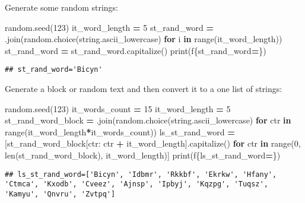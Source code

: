 \documentclass[
]{book}
\newenvironment{Shaded}{\begin{snugshade}}{\end{snugshade}}
\newcommand{\BuiltInTok}[1]{#1}
\newcommand{\ControlFlowTok}[1]{\textcolor[rgb]{0.13,0.29,0.53}{\textbf{#1}}}
\newcommand{\DecValTok}[1]{\textcolor[rgb]{0.00,0.00,0.81}{#1}}
\newcommand{\KeywordTok}[1]{\textcolor[rgb]{0.13,0.29,0.53}{\textbf{#1}}}
\newcommand{\NormalTok}[1]{#1}
\newcommand{\OperatorTok}[1]{\textcolor[rgb]{0.81,0.36,0.00}{\textbf{#1}}}
\newcommand{\SpecialCharTok}[1]{\textcolor[rgb]{0.00,0.00,0.00}{#1}}
\newcommand{\SpecialStringTok}[1]{\textcolor[rgb]{0.31,0.60,0.02}{#1}}
\newcommand{\StringTok}[1]{\textcolor[rgb]{0.31,0.60,0.02}{#1}}
\begin{document}
Generate some random strings:

\begin{Shaded}
\begin{Highlighting}[]
\NormalTok{random.seed(}\DecValTok{123}\NormalTok{)}
\NormalTok{it\_word\_length }\OperatorTok{=} \DecValTok{5}
\NormalTok{st\_rand\_word }\OperatorTok{=} \StringTok{\textquotesingle{}\textquotesingle{}}\NormalTok{.join(random.choice(string.ascii\_lowercase) }\ControlFlowTok{for}\NormalTok{ i }\KeywordTok{in} \BuiltInTok{range}\NormalTok{(it\_word\_length))}
\NormalTok{st\_rand\_word }\OperatorTok{=}\NormalTok{ st\_rand\_word.capitalize()}
\BuiltInTok{print}\NormalTok{(}\SpecialStringTok{f\textquotesingle{}}\SpecialCharTok{\{}\NormalTok{st\_rand\_word}\OperatorTok{=}\SpecialCharTok{\}}\SpecialStringTok{\textquotesingle{}}\NormalTok{)}
\end{Highlighting}
\end{Shaded}

\begin{verbatim}
## st_rand_word='Bicyn'
\end{verbatim}

Generate a block or random text and then convert it to a one list of strings:

\begin{Shaded}
\begin{Highlighting}[]
\NormalTok{random.seed(}\DecValTok{123}\NormalTok{)}
\NormalTok{it\_words\_count }\OperatorTok{=} \DecValTok{15}
\NormalTok{it\_word\_length }\OperatorTok{=} \DecValTok{5}
\NormalTok{st\_rand\_word\_block }\OperatorTok{=} \StringTok{\textquotesingle{}\textquotesingle{}}\NormalTok{.join(random.choice(string.ascii\_lowercase) }\ControlFlowTok{for}\NormalTok{ ctr }\KeywordTok{in} \BuiltInTok{range}\NormalTok{(it\_word\_length}\OperatorTok{*}\NormalTok{it\_words\_count))}
\NormalTok{ls\_st\_rand\_word }\OperatorTok{=}\NormalTok{ [st\_rand\_word\_block[ctr: ctr }\OperatorTok{+}\NormalTok{ it\_word\_length].capitalize() }
                   \ControlFlowTok{for}\NormalTok{ ctr }\KeywordTok{in} \BuiltInTok{range}\NormalTok{(}\DecValTok{0}\NormalTok{, }\BuiltInTok{len}\NormalTok{(st\_rand\_word\_block), it\_word\_length)]}
\BuiltInTok{print}\NormalTok{(}\SpecialStringTok{f\textquotesingle{}}\SpecialCharTok{\{}\NormalTok{ls\_st\_rand\_word}\OperatorTok{=}\SpecialCharTok{\}}\SpecialStringTok{\textquotesingle{}}\NormalTok{)}
\end{Highlighting}
\end{Shaded}

\begin{verbatim}
## ls_st_rand_word=['Bicyn', 'Idbmr', 'Rkkbf', 'Ekrkw', 'Hfany', 'Ctmca', 'Kxodb', 'Cveez', 'Ajnsp', 'Ipbyj', 'Kqzpg', 'Tuqsz', 'Kamyu', 'Qnvru', 'Zvtpq']
\end{verbatim}
\end{document}
